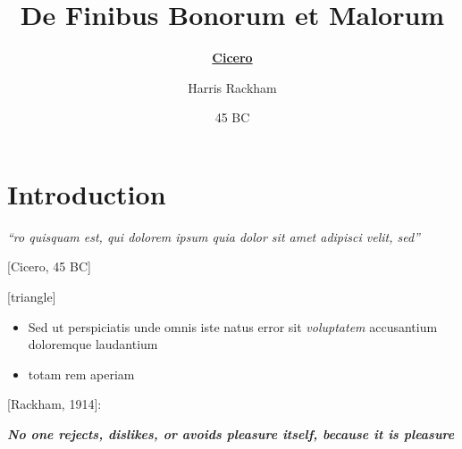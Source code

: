 \documentclass{beamer}
\begin{document}
\title{De Finibus Bonorum et Malorum}
\author{\textbf{\underline{Cicero}}\and Harris Rackham}
\date{45 BC}

\frame{\titlepage}

\section{Introduction}

\begin{frame}
  \hspace{-0.8cm}
    
  \textit{\LARGE\color{oxlighterblue}
    ``ro quisquam est, qui dolorem ipsum quia dolor sit amet adipisci velit, sed''
  }

    \hspace{2.1cm}\hfill [Cicero, 45 BC]

  [triangle]
  \vspace{1cm}
  {
    \begin{itemize}
    \item Sed ut perspiciatis unde omnis iste natus error sit \emph{voluptatem} accusantium doloremque laudantium
    \item totam rem aperiam
    \end{itemize}
  }
  
  \vspace{0.5cm}
  {[Rackham, 1914]:

    {\large
    \textbf{\textit{\color{oxlighterblue}No one rejects, dislikes, or avoids pleasure itself, because it is \emph{pleasure}}}}
  }

\end{frame}
\end{document}
